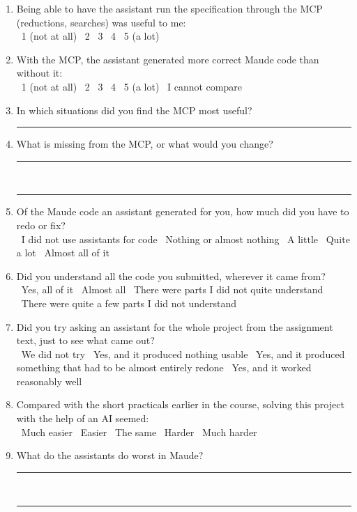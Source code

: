 \begin{enumerate}[leftmargin=*,resume]
\item Being able to have the assistant run the specification through the MCP
(reductions, searches) was useful to me:\\
\cb\ 1 (not at all) \quad \cb\ 2 \quad \cb\ 3 \quad \cb\ 4 \quad \cb\ 5 (a lot)

\item With the MCP, the assistant generated more correct Maude code than
without it:\\
\cb\ 1 (not at all) \quad \cb\ 2 \quad \cb\ 3 \quad \cb\ 4 \quad \cb\ 5 (a lot)
\quad \cb\ I cannot compare

\item In which situations did you find the MCP most useful?\\[8pt]
\rule{\linewidth}{0.4pt}

\item What is missing from the MCP, or what would you change?\\[8pt]
\rule{\linewidth}{0.4pt}\\[10pt]
\rule{\linewidth}{0.4pt}

\item\label{q:rehacer} Of the Maude code an assistant generated for you, how much did you have
to redo or fix?\\
\cb\ I did not use assistants for code \quad \cb\ Nothing or almost nothing \quad
\cb\ A little \quad \cb\ Quite a lot \quad \cb\ Almost all of it

\item Did you understand all the code you submitted, wherever it came from?\\
\cb\ Yes, all of it \quad \cb\ Almost all \quad \cb\ There were parts I did not quite understand \quad
\cb\ There were quite a few parts I did not understand

\item Did you try asking an assistant for the whole project from the
assignment text, just to see what came out?\\
\cb\ We did not try \quad
\cb\ Yes, and it produced nothing usable \quad
\cb\ Yes, and it produced something that had to be almost entirely redone \quad
\cb\ Yes, and it worked reasonably well

\item Compared with the short practicals earlier in the course, solving this
project with the help of an AI seemed:\\
\cb\ Much easier \quad \cb\ Easier \quad \cb\ The same \quad
\cb\ Harder \quad \cb\ Much harder

\item What do the assistants do worst in Maude?\\[8pt]
\rule{\linewidth}{0.4pt}\\[10pt]
\rule{\linewidth}{0.4pt}

\end{enumerate}

